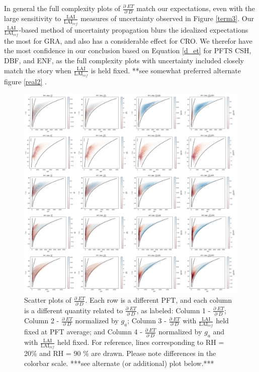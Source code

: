 \documentclass[draft,linenumbers]{agujournal}
\begin{document}
In general the full complexity plots of $\frac{\partial \; ET}{\partial \; D}$ match our expectations, even with the large sensitivity to $\frac{\text{LAI}}{\text{LAI$_{ref}$}}$ measures of uncertainty observed in Figure \ref{term3}. Our $\frac{\text{LAI}}{\text{LAI$_{ref}$}}$-based method of uncertainty propagation blurs the idealized expectations the most for GRA, and also has a considerable effect for CRO. We therefor have the most confidence in our conclusion based on Equation \ref{d_et} for PFTS CSH, DBF, and ENF, as the full complexity plots with uncertainty included closely match the story when $\frac{\text{LAI}}{\text{LAI$_{ref}$}}$ is held fixed. **see somewhat preferred alternate figure \ref{real2} .
\begin{figure}[h]
\centering
\includegraphics[width=\textwidth]{./fig06.png}
\caption{Scatter plots of $\frac{\partial \; ET}{\partial \; D}$. Each row is a different PFT, and each column is a different quantity related to $\frac{\partial \; ET}{\partial \; D}$, as labeled: Column 1 - $\frac{\partial \; ET}{\partial \; D}$; Column 2 - $\frac{\partial \; ET}{\partial \; D}$ normalized by $g_a$; Column 3 - $\frac{\partial \; ET}{\partial \; D}$ with $\frac{\text{LAI}}{\text{LAI$_{ref}$}}$ held fixed at PFT average; and Column 4 - $\frac{\partial \; ET}{\partial \; D}$ normalized by $g_a$ and with $\frac{\text{LAI}}{\text{LAI$_{ref}$}}$ held fixed. For reference, lines corresponding to RH = 20\% and RH = 90 \% are drawn. Please note differences in the colorbar scale. ***see alternate (or additional) plot below.***}
\label{real}
\end{figure}
\end{document}
